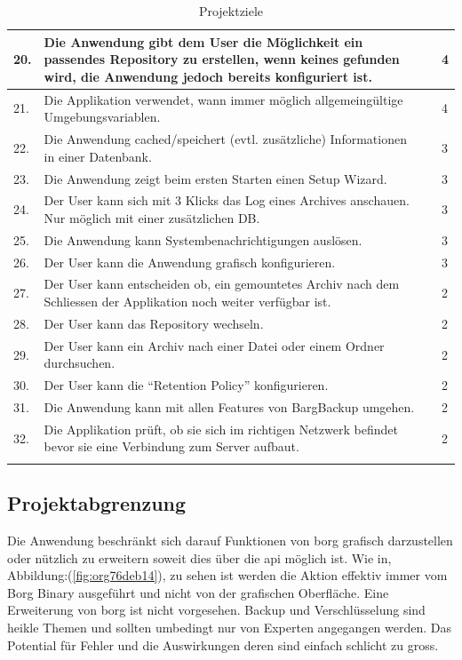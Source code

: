 \begin{longtable}{|p{1cm}|p{9cm}|p{1.5cm}|p{2cm}|}
\hline
20. & Die Anwendung gibt dem User die Möglichkeit ein passendes Repository zu erstellen, wenn keines gefunden wird, die Anwendung jedoch bereits konfiguriert ist. &  & 4\\
\hline
21. & Die Applikation verwendet, wann immer möglich allgemeingültige Umgebungsvariablen. &  & 4\\
\hline
22. & Die Anwendung cached/speichert (evtl. zusätzliche) Informationen in einer Datenbank. &  & 3\\
\hline
23. & Die Anwendung zeigt beim ersten Starten einen Setup Wizard. &  & 3\\
\hline
24. & Der User kann sich mit 3 Klicks das Log eines Archives anschauen. Nur möglich mit einer zusätzlichen DB. &  & 3\\
\hline
25. & Die Anwendung kann Systembenachrichtigungen auslösen. &  & 3\\
\hline
26. & Der User kann die Anwendung grafisch konfigurieren. &  & 3\\
\hline
27. & Der User kann entscheiden ob, ein gemountetes Archiv nach dem Schliessen der Applikation noch weiter verfügbar ist. &  & 2\\
\hline
28. & Der User kann das Repository wechseln. &  & 2\\
\hline
29. & Der User kann ein Archiv nach einer Datei oder einem Ordner durchsuchen. &  & 2\\
\hline
30. & Der User kann die "`Retention Policy"' konfigurieren. &  & 2\\
\hline
31. & Die Anwendung kann mit allen Features von BargBackup umgehen. &  & 2\\
\hline
32. & Die Applikation prüft, ob sie sich im richtigen Netzwerk befindet bevor sie eine Verbindung zum Server aufbaut. &  & 2\\
\hline
\caption{\label{tab:org0d17f53}
Projektziele}
\\
\end{longtable}
\newpage

\subsection{Projektabgrenzung}
\label{sec:org880aef4}

Die Anwendung beschränkt sich darauf Funktionen von \gls{borg} grafisch
darzustellen oder nützlich zu erweitern soweit dies über die \gls{api} möglich
ist. Wie in, Abbildung:(\ref{fig:org76deb14}), zu sehen ist werden die Aktion effektiv
immer vom Borg Binary ausgeführt und nicht von der grafischen Oberfläche. Eine
Erweiterung von \gls{borg} ist nicht vorgesehen. Backup und Verschlüsselung sind
heikle Themen und sollten umbedingt nur von Experten angegangen werden. Das
Potential für Fehler und die Auswirkungen deren sind einfach schlicht zu gross.

